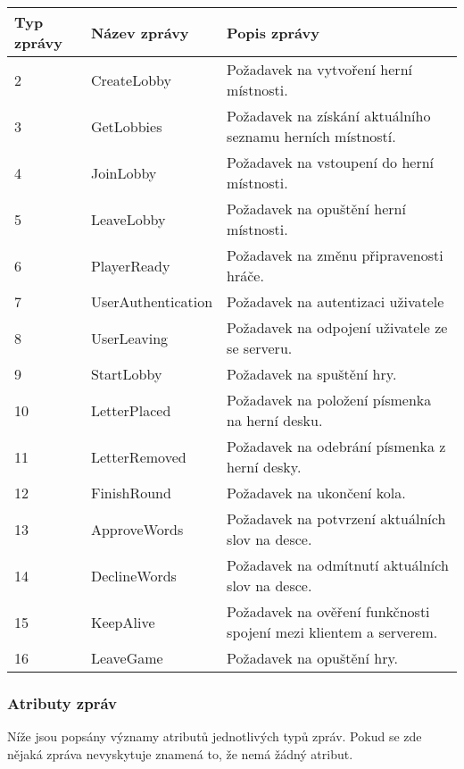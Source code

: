 \documentclass[12pt, a4paper]{article}
\begin{document}
\begin{center}
		\begin{tabular}{| p{1.2cm} | p{3.4cm} | p{7.830cm} |}
			\hline
			\textbf{Typ zprávy} & \textbf{Název zprávy} & \textbf{Popis zprávy} \\ 
			\hline
			2          &CreateLobby              &Požadavek na vytvoření herní místnosti.\\
			\hline
			3          &GetLobbies              &Požadavek na získání aktuálního seznamu herních místností.\\
			\hline
			4          &JoinLobby              &Požadavek na vstoupení do herní místnosti. \\
			\hline
			5          &LeaveLobby              &Požadavek na opuštění herní místnosti.\\
			\hline
			6          &PlayerReady              &Požadavek na změnu připravenosti hráče.\\
			\hline
			7          &UserAuthentication              &Požadavek na autentizaci uživatele\\
			\hline
			8          &UserLeaving              &Požadavek na odpojení uživatele ze se serveru.\\
			\hline
			9          &StartLobby              &Požadavek na spuštění hry.\\
			\hline
			10          &LetterPlaced              &Požadavek na položení písmenka na herní desku.\\
			\hline
			11          &LetterRemoved              &Požadavek na odebrání písmenka z herní desky.\\
			\hline
			12          &FinishRound              &Požadavek na ukončení kola.\\
			\hline
			13          &ApproveWords              &Požadavek na potvrzení aktuálních slov na desce.\\
			\hline
			14          &DeclineWords             &Požadavek na odmítnutí aktuálních slov na desce.\\
			\hline
			15          &KeepAlive              &Požadavek na ověření funkčnosti spojení mezi klientem a serverem.\\
			\hline
			16          &LeaveGame              &Požadavek na opuštění hry.\\
			\hline
		\end{tabular}
\end{center}  

		\subsubsection{Atributy zpráv}
		Níže jsou popsány významy atributů jednotlivých typů zpráv. Pokud se zde nějaká zpráva nevyskytuje znamená to, že nemá žádný atribut.
		
\end{document}
